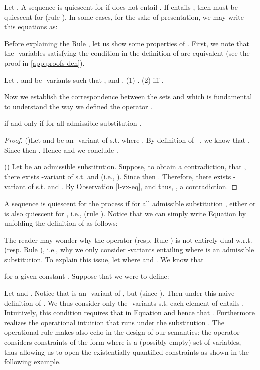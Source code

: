 \documentclass{tlp}
\begin{document}
Let . A sequence  is quiescent for  if  does not entail . If  entails , then   must be quiescent for  (rule ). In some cases, for the sake of presentation, we may write this equations as:
   
      Before explaining the Rule , let us show some properties of . First, we note that the -variables satisfying the condition 
    in the definition of  are equivalent (see the proof in \ref{app:proofs-den}). 
   
   \begin{observation}\label{l-vx-eq}
Let ,  and    be -variants such that ,    and . (1)  . (2)    iff . 
\end{observation}
      
Now we  establish the correspondence between 
the sets    and   which is fundamental to  understand the way we defined the operator .

   \begin{proposition}\label{prop:forall-subs}
 if and only if   for all admissible substitution . 
\end{proposition}
\begin{proof}
()Let  and   be an -variant of  s.t.  where . By definition of~ , we know that . Since  then . Hence  and we conclude . 

\noindent() Let  be an admissible substitution. Suppose, to obtain a contradiction, that , there exists  -variant of  s.t.  and  (i.e., ). Since  then .  Therefore, there exists  -variant of  s.t.  and . By Observation \ref{l-vx-eq},   and thus,  , a contradiction. 
\end{proof}


   
A sequence  is quiescent for  the process    if for all admissible substitution , either  or   is also quiescent for , i.e.,  (rule ).    Notice that we can simply write Equation  by unfolding the definition of  as follows:



 The reader may wonder why the operator  (resp. Rule ) is not entirely  dual w.r.t.  (resp. Rule ), i.e., why we only consider -variants entailing  where  is an admissible substitution.   
 To explain this issue, let  where  and . We know that 

 for a given constant .  Suppose that we were to define:


Let 
and .  Notice that   is an  -variant   of ,   but  (since ). Then  under this naive definition of . We thus consider only the -variants  s.t. each element of  entails .    Intuitively, this condition 
requires that   in Equation  
and hence that . Furthermore   realizes the operational intuition that  runs under the substitution . 
The operational rule  makes also echo in the design of our   semantics: the operator  considers   constraints of the form  where  is a (possibly empty) set of variables, thus  allowing us to open the existentially quantified constraints as shown in the following example.
\end{document}
